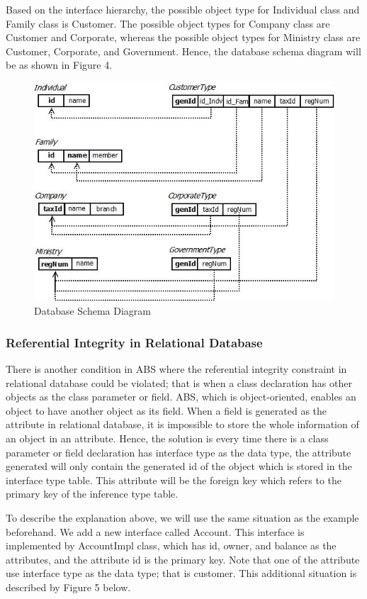 \documentclass[runningheads,a4paper]{llncs}
\begin{document}
Based on the interface hierarchy, the possible object type for Individual class and Family class is Customer. The possible object types for Company class are Customer and Corporate, whereas the possible object types for Ministry class are Customer, Corporate, and Government. Hence, the database schema diagram will be as shown in Figure 4.

\begin{figure}
	\centering
	\includegraphics[scale=0.7]{db1.jpg}
	\caption{Database Schema Diagram}
	\label{sample}
\end{figure}

\subsubsection{Referential Integrity in Relational Database}
There is another condition in ABS where the referential integrity constraint in relational database could be violated; that is when a class declaration has other objects as the class parameter or field. ABS, which is object-oriented, enables an object to have another object as its field. When a field is generated as the attribute in relational database, it is impossible to store the whole information of an object in an attribute. Hence, the solution is every time there is a class parameter or field declaration has interface type as the data type, the attribute generated will only contain the generated id of the object which is stored in the interface type table. This attribute will be the foreign key which refers to the primary key of the inference type table.

To describe the explanation above, we will use the same situation as the example beforehand. We add a new interface called Account. This interface is implemented by AccountImpl class, which has id, owner, and balance as the attributes, and the attribute id is the primary key. Note that one of the attribute use interface type as the data type; that is customer. This additional situation is described by Figure 5 below.
\end{document}
